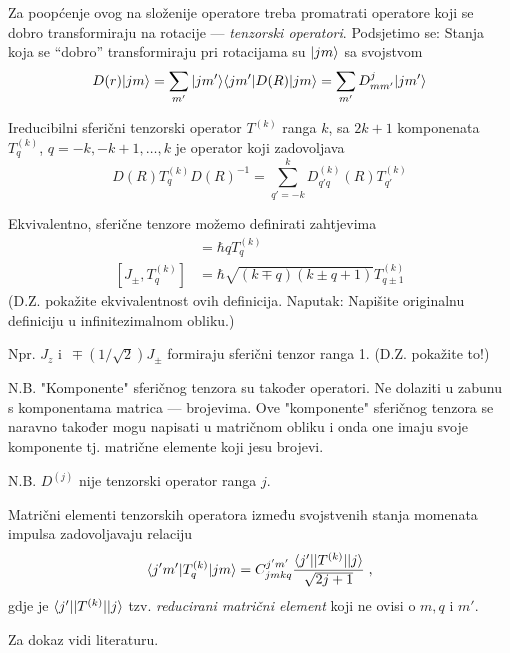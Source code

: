 Za poopćenje ovog na složenije operatore treba promatrati operatore koji
se dobro transformiraju na rotacije  --- \emph{tenzorski operatori}.
Podsjetimo se: Stanja koja se ``dobro'' transformiraju pri rotacijama
su $| jm \rangle$ sa svojstvom
\begin{displaymath}
 D(r) | jm \rangle = \sum_{m'} | jm' \rangle\langle jm' |D(R)| jm \rangle
               = \sum_{m'} D^{j}_{mm'}| jm' \rangle
\end{displaymath}

\begin{definicija}
Ireducibilni sferični tenzorski operator $T^{(k)}$ ranga $k$, sa
$2k+1$ komponenata $T^{(k)}_q$, $q=-k,-k+1,\ldots,k$ je operator
koji zadovoljava
\begin{equation}
 D(R) T^{(k)}_q D(R)^{-1} = \sum_{q'=-k}^{k} D^{(k)}_{q'q}(R)
      T^{(k)}_{q'}
\end{equation}
\end{definicija}


Ekvivalentno, sferične tenzore možemo definirati zahtjevima
\begin{align}
[J_z, T^{(k)}_q ] &= \hbar q T^{(k)}_q \\
[J_\pm, T^{(k)}_q] &= \hbar \sqrt{(k\mp q)(k\pm q +1)} T^{(k)}_{q\pm 1}
\end{align}
(D.Z. pokažite ekvivalentnost ovih definicija. Naputak: Napišite originalnu
definiciju u infinitezimalnom obliku.)

Npr. $J_z$ i $\,\mp (1/\sqrt{2})J_\pm$ formiraju sferični tenzor ranga 1.
(D.Z. pokažite to!)


N.B. "Komponente" sferičnog tenzora su također operatori. Ne dolaziti u
zabunu s komponentama matrica --- brojevima. Ove "komponente" sferičnog
tenzora se naravno također mogu napisati u matričnom obliku i onda one
imaju svoje komponente tj. matrične elemente koji jesu brojevi.

N.B. $D^{(j)}$ nije tenzorski operator ranga $j$.

\begin{teorem}
Matrični elementi tenzorskih operatora između svojstvenih stanja momenata
impulsa zadovoljavaju relaciju
\begin{equation}
 \langle j'm' |T^{(k)}_q | jm \rangle = C^{j'm'}_{jmkq}
\frac{\langle j' ||T^{(k)}|| j \rangle}{\sqrt{2j+1}} \;,
\end{equation}
gdje je $\langle j' ||T^{(k)}|| j \rangle$ tzv. \emph{reducirani matrični element}
koji ne ovisi o $m, q$ i $m'$.
\end{teorem}
Za dokaz vidi literaturu.

